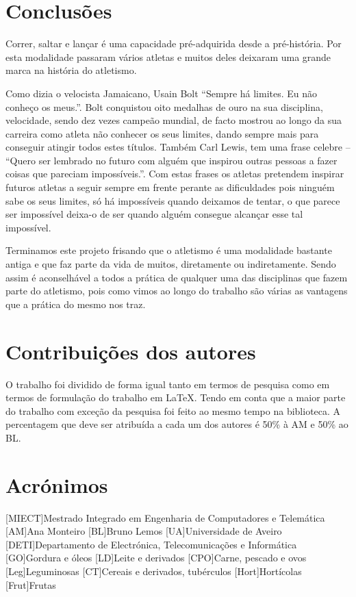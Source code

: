 \documentclass{report}
\begin{document}
\chapter{Conclusões}
\label{chap.Conclusões}
Correr, saltar e lançar é uma capacidade pré-adquirida desde a pré-história. Por esta modalidade passaram vários atletas e muitos deles deixaram uma grande marca na história do atletismo. \par
Como dizia o velocista Jamaicano, Usain Bolt “Sempre há limites. Eu não conheço os meus.”. Bolt conquistou oito medalhas de ouro na sua disciplina, velocidade, sendo dez vezes campeão mundial, de facto mostrou ao longo da sua carreira como atleta não conhecer os seus limites, dando sempre mais para conseguir atingir todos estes títulos. Também Carl Lewis, tem uma frase celebre – “Quero ser lembrado no futuro com alguém que inspirou outras pessoas a fazer coisas que pareciam impossíveis.”. Com estas frases os atletas pretendem inspirar futuros atletas a seguir sempre em frente perante as dificuldades pois ninguém sabe os seus limites, só há impossíveis quando deixamos de tentar, o que parece ser impossível deixa-o de ser quando alguém consegue alcançar esse tal impossível.\par
Terminamos este projeto frisando que o atletismo é uma modalidade bastante antiga e que faz parte da vida de muitos, diretamente ou indiretamente. Sendo assim é aconselhável a todos a prática de qualquer uma das disciplinas que fazem parte do atletismo, pois como vimos ao longo do trabalho são várias as vantagens que a prática do mesmo nos traz.   


\chapter*{Contribuições dos autores}

O trabalho foi dividido de forma igual tanto em termos de pesquisa como em termos de formulação do trabalho em \LaTeX. Tendo em conta que a maior parte do trabalho com exceção da pesquisa foi feito ao mesmo tempo na biblioteca.
A percentagem que deve ser atribuída a cada um dos autores é 50\% à \ac{AM}  e 50\% ao \ac{BL}.


\chapter*{Acrónimos}
\begin{acronym}
[MIECT]{Mestrado Integrado em Engenharia de Computadores e Telemática}
[AM]{Ana Monteiro}
[BL]{Bruno Lemos}
[UA]{Universidade de Aveiro}
[DETI]{Departamento de Electrónica, Telecomunicações e Informática}
[GO]{Gordura e óleos}
[LD]{Leite e derivados}
[CPO]{Carne, pescado e ovos}
[Leg]{Leguminosas}
[CT]{Cereais e derivados, tubérculos}
[Hort]{Hortícolas}
[Frut]{Frutas}
\end{acronym}


\printbibliography
\end{document}

